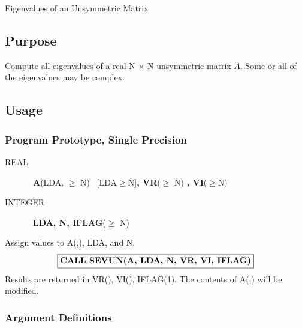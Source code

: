\documentclass[twoside]{MATH77}
\begin{document}
 Eigenvalues of an Unsymmetric Matrix


\subsection{Purpose}

Compute all eigenvalues of a real N $\times $ N unsymmetric matrix $A$. Some or all
of the eigenvalues may be complex.

\subsection{Usage}

\subsubsection{Program Prototype, Single Precision}

\begin{description}
\item[REAL]  \ {\bf A}(LDA, $\geq $ N) \ [LDA$\geq $N]{\bf , VR}($\geq $ N)%
{\bf , VI}($\geq $N)

\item[INTEGER]  \ {\bf LDA, N, IFLAG}($\geq $ N)
\end{description}

Assign values to A(,), LDA, and N.
$$
\fbox{{\bf CALL SEVUN(A, LDA, N, VR, VI, IFLAG)}}
$$
Results are returned in VR(), VI(), IFLAG(1). The contents of A(,) will be
modified.

\subsubsection{Argument Definitions}
\end{document}
